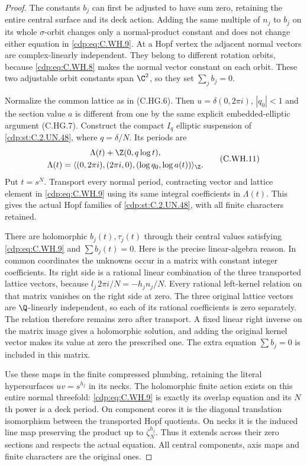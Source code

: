 \begin{proof}
The constants $b_j$ can first be
adjusted to have sum zero, retaining
the entire central surface and its
deck action. Adding the same multiple
of $n_j$ to $b_j$ on its whole
$\sigma$-orbit changes only a
normal-product constant and does
not change either equation in
\eqref{cdp:eq:C.WH.9}. At a Hopf vertex the
adjacent normal vectors are
complex-linearly independent.
They belong to different rotation
orbits, because \eqref{cdp:eq:C.WH.8} makes
the normal vector constant on
each orbit. These two adjustable
orbit constants span $\C^2$,
so they set $\sum_j b_j=0$.

Normalize the common lattice as in
(C.HG.6). Then $u=\delta(0,2\pi i)$,
$|q_0|<1$ and the section value
$a$ is different from one by the
same explicit embedded-elliptic
argument (C.HG.7).
Construct the compact $I_q$
elliptic suspension of \ref{cdp:st:C.2.UN.48},
where $q=\delta/N$. Its periods are
\[
 \begin{gathered}
 \Lambda(t)+\Z(0,q\log t),\\
 \Lambda(t)=
 \langle(0,2\pi i),(2\pi i,0),
                       (\log q_0,\log a(t))\rangle_{\Z} .
 \end{gathered}
\tag{C.WH.11}\label{cdp:eq:C.WH.11}
\]
Put $t=s^N$. Transport every normal
period, contracting vector and
lattice element in \eqref{cdp:eq:C.WH.9} using
its same integral coefficients in
$\Lambda(t)$. This gives the actual
Hopf families of \ref{cdp:st:C.2.UN.48}, with all
finite characters retained.

There are holomorphic $b_j(t),\tau_j(t)$
through their central values satisfying
\eqref{cdp:eq:C.WH.9} and $\sum b_j(t)=0$.
Here is the precise linear-algebra
reason. In common coordinates the
unknowns occur in a matrix with
constant integer coefficients.
Its right side is a rational linear
combination of the three transported
lattice vectors, because
$l_j\,2\pi i/N=-h_jn_j/N$.
Every rational left-kernel relation
on that matrix vanishes on the
right side at zero. The three
original lattice vectors are
$\Q$-linearly independent, so each
of its rational coefficients is
zero separately. The relation
therefore remains zero after
transport. A fixed linear right
inverse on the matrix image gives
a holomorphic solution, and adding
the original kernel vector makes
its value at zero the prescribed
one. The extra equation $\sum b_j=0$
is included in this matrix.

Use these maps in the finite
compressed plumbing, retaining the
literal hypersurfaces $uv=s^{h_j}$
in its necks. The holomorphic
finite action exists on this entire
normal threefold: \eqref{cdp:eq:C.WH.9} is
exactly its overlap equation and
its $N$th power is a deck period.
On component cores it is the
diagonal translation isomorphism
between the transported Hopf
quotients. On necks it is the
induced line map preserving the
product up to $\zeta_N^{h_j}$.
Thus it extends across their
zero sections and respects the
actual equation. All central
components, axis maps and finite
characters are the original ones.


\end{proof}
